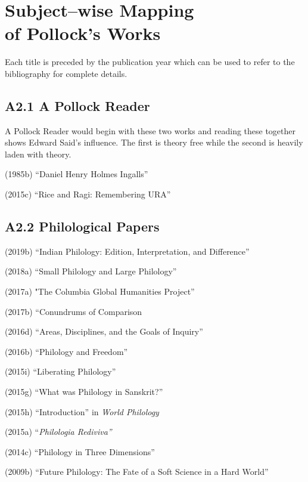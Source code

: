 
\chapter{Subject–wise Mapping\\ of Pollock’s Works}\label{Anubandha2}

Each title is preceded by the publication year which can be used to refer to the bibliography for complete details.

\vspace{-.4cm}

\section*{A2.1 A Pollock Reader}

A Pollock Reader would begin with these two works and reading these together shows Edward Said’s influence. The first is theory free while the second is heavily laden with theory.

(1985b) “Daniel Henry Holmes Ingalls”

(2015c) “Rice and Ragi: Remembering URA”

\vspace{-.4cm}

\section*{A2.2 Philological Papers}

(2019b) “Indian Philology: Edition, Interpretation, and Difference”

(2018a) “Small Philology and Large Philology”

(2017a) "The Columbia Global Humanities Project”

(2017b) “Conundrums of Comparison

(2016d) “Areas, Disciplines, and the Goals of Inquiry”

(2016b) “Philology and Freedom”

(2015i) “Liberating Philology”

(2015g) “What was Philology in Sanskrit?”

(2015h) “Introduction” in \textit{World Philology}

(2015a) “\textit{Philologia Rediviva”}

(2014c) “Philology in Three Dimensions”

(2009b) “Future Philology: The Fate of a Soft Science in a Hard World”

